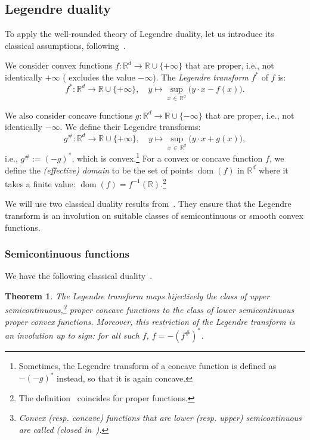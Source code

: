 \documentclass[10pt]{amsart}
\newtheorem{theo}{Theorem}[section]
\theoremstyle{definition}\newtheorem{defi}[theo]{Definition}\newtheorem{rema}[theo]{Remark}\newtheorem{exam}[theo]{Example}\newtheorem{exem}[theo]{Example}\newtheorem{nota}[theo]{Notation}
\theoremstyle{plain}
\theoremstyle{plain}
\newcommand\dom{\operatorname{dom}}
\newcommand*\8{\infty}
\newcommand\RR{\mathbb{R}}
\begin{document}
\subsection{Legendre duality}


To apply the well-rounded theory of Legendre duality, let us introduce its classical assumptions, following~\cite{Rockafellar-book}.

We consider convex functions $f:\RR^d\to\RR\cup\{ +\infty\}$ that are proper, i.e., not identically $+\infty$ (\cite[p.~24]{Rockafellar-book} excludes the value $-\infty$). The \emph{Legendre transform} $f^*$ of $f$ is:
\[
f^*:\RR^d\to\RR\cup\{+\infty\},\quad y \mapsto \sup_{x\,\in\,\RR^d} \big(y \cdot x - f(x)\big).
\]


We also consider concave functions $g:\RR^d\to\RR\cup\{ -\infty\}$ that are proper, i.e., not identically $-\infty$. We define their Legendre transforms:
\[
g^{\#}:\RR^d\to\RR\cup\{ +\infty\},\quad y \mapsto \sup_{x\,\in\,\RR^d} \big(y \cdot x + g(x)\big),
\]
i.e., $g^{\#}:=(-g)^*$, which is convex.\footnote{Sometimes, the Legendre transform of a concave function is defined as $-(-g)^*$ instead, so that it is again concave.}
For a convex or concave function $f$, we define the \emph{(effective) domain} to be the set of points $\dom(f)$ in $\RR^d$ where it takes a finite value: $\dom(f)=f^{-1}(\RR)$.\footnote{The definition~\cite[p.~23]{Rockafellar-book} coincides for proper functions.}




We will use two classical duality results from~\cite{Rockafellar-book}. They ensure that the Legendre transform is an involution on suitable classes of semicontinuous or smooth convex functions.


\subsubsection*{Semicontinuous functions}
We have the following classical duality~\cite[Corollary~12.2.1]{Rockafellar-book}.


\begin{theo}\label{theo-duality-CO}
The Legendre transform maps bijectively the class of upper semicontinuous,\footnote{Convex (resp. concave) functions that are lower (resp. upper) semicontinuous are called (\emph{closed} in~\cite[p.~52]{Rockafellar-book}).} proper concave functions to the class of lower semicontinuous proper convex functions. Moreover, this restriction of the Legendre transform is an involution up to sign: for all such $f$, $f=-(f^{\#})^*$.
\end{theo}
\end{document}
